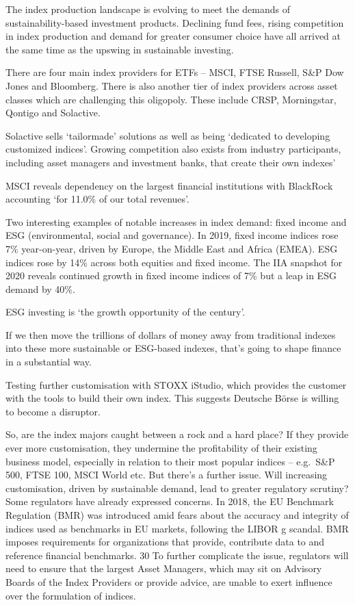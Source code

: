 \documentclass[
]{book}
\begin{document}
The index production landscape is evolving to meet the demands of
sustainability-based investment products. Declining fund fees, rising
competition in index production and demand for greater consumer
choice have all arrived at the same time as the upswing in sustainable
investing.

There are four main index providers for ETFs -- MSCI, FTSE Russell, S\&P Dow Jones and Bloomberg.
There is also another tier of index providers across asset classes which
are challenging this oligopoly.
These include CRSP, Morningstar, Qontigo and Solactive.

Solactive sells `tailormade' solutions as well as being `dedicated to developing
customized indices'.
Growing competition also exists from industry participants, including asset
managers and investment banks, that create their own indexes'

MSCI reveals dependency on the largest financial institutions with
BlackRock accounting `for 11.0\% of our total revenues'.

Two interesting examples of notable increases in
index demand: fixed income and ESG (environmental, social and governance).
In 2019, fixed income indices rose 7\% year-on-year, driven by Europe,
the Middle East and Africa (EMEA).
ESG indices rose by 14\% across both equities and fixed income.
The IIA snapshot for 2020 reveals continued growth in
fixed income indices of 7\% but a leap in ESG demand by 40\%.

ESG investing is `the growth opportunity of the century'.

If we then move the trillions of dollars of money away
from traditional indexes into these more sustainable or ESG-based indexes, that's going to
shape finance in a substantial way.

Testing further customisation
with STOXX iStudio, which provides the customer with the tools to build their own index.
This suggests Deutsche Börse is willing to become a disruptor.

So, are the index majors caught between a rock and a hard place? If they provide ever more
customisation, they undermine the profitability of their existing business model, especially in relation
to their most popular indices -- e.g.~S\&P 500, FTSE 100, MSCI World etc.
But there's a further issue. Will increasing customisation, driven by sustainable demand, lead to
greater regulatory scrutiny? Some regulators have already expressed concerns. In 2018, the EU
Benchmark Regulation (BMR) was introduced amid fears about the accuracy and integrity of indices
used as benchmarks in EU markets, following the LIBOR g scandal. BMR imposes requirements for
organizations that provide, contribute data to and reference financial benchmarks. 30 To further
complicate the issue, regulators will need to ensure that the largest Asset Managers, which may sit
on Advisory Boards of the Index Providers or provide advice, are unable to exert influence over the
formulation of indices.
\end{document}
